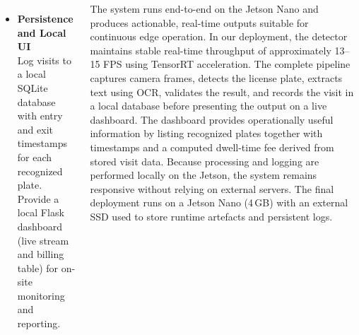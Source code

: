 \documentclass[25pt,a0paper,portrait]{tikzposter}
\begin{document}
\begin{columns}
{{\begin{itemize}
				
				\item \textbf{Persistence and Local UI}\\
				Log visits to a local SQLite database with entry and exit timestamps for each recognized plate. Provide a local Flask dashboard (live stream and billing table) for on-site monitoring and reporting.\newline
					
				\end{itemize}
			
			}
			
			{
			The system runs end-to-end on the Jetson Nano and produces actionable, real-time outputs suitable for continuous edge operation. In our deployment, the detector maintains stable real-time throughput of approximately 13--15 FPS using TensorRT acceleration. \newline The complete pipeline captures camera frames, detects the license plate, extracts text using OCR, validates the result, and records the visit in a local database before presenting the output on a live dashboard. \newline \newline
			The dashboard provides operationally useful information by listing recognized plates together with timestamps and a computed dwell-time fee derived from stored visit data. Because processing and logging are performed locally on the Jetson, the system remains responsive without relying on external servers. The final deployment runs on a Jetson Nano (4\,GB) with an external SSD used to store runtime artefacts and persistent logs. \newline
			}
		}
		
	\end{columns}
	
\end{document}
